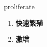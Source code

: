 
\begin{frame}
{\huge proliferate}
\begin{center}
\begin{enumerate}\Large
  \item \textbf{快速繁殖}
  \item \textbf{激增}
\end{enumerate}
\end{center}
\end{frame}
